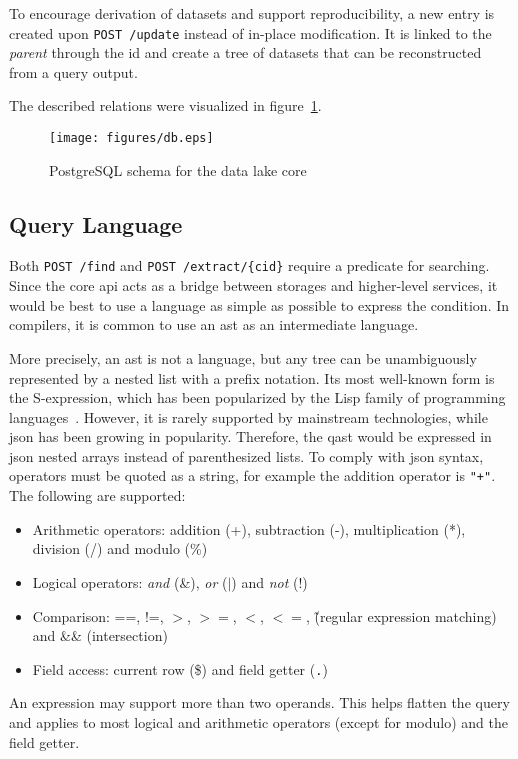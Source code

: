 To encourage derivation of datasets and support reproducibility, a new entry
is created upon \verb|POST /update| instead of in-place modification.  It is
linked to the \emph{parent} through the \gls{id} and create a \gls{tree}
of datasets that can be reconstructed from a query output.

The described relations were visualized in figure~\ref{db}.

\begin{figure}
  \texttt{[image: figures/db.eps]}
  \caption{PostgreSQL schema for the data lake core}
  \label{db}
\end{figure}

\subsection{Query Language}
Both \verb|POST /find| and \verb|POST /extract/{cid}| require a \gls{predicate}
for searching.  Since the core \gls{api} acts as a bridge between storages
and higher-level services, it would be best to use a language as simple
as possible to express the condition.  In compilers, it is common to use
an \gls{ast} as an intermediate language.

More precisely, an \gls{ast} is not a language, but any tree can
be unambiguously represented by a nested list with a prefix notation.
Its most well-known form is the S-expression, which has been popularized
by the Lisp family of programming languages~\cite{sexpr}.  However, it is
rarely supported by mainstream technologies, while \gls{json} has been
growing in popularity.  Therefore, the \gls{qast} would be expressed
in \gls{json} nested arrays instead of parenthesized lists.  To comply
with \gls{json} syntax, operators must be quoted as a string, for example
the addition operator is \verb|"+"|.  The following are supported:
\begin{itemize}
  \item Arithmetic operators: addition (+), subtraction (-), multiplication (*),
    division (/) and modulo (\%)
  \item Logical operators: \emph{and} (\&), \emph{or} ($\vert$)
    and \emph{not} (!)
  \item Comparison: ==, !=, $>$, $>=$, $<$, $<=$,
    \~ (regular expression matching) and \&\& (intersection)
  \item Field access: current row (\$) and field getter (\verb|.|)
\end{itemize}

An expression may support more than two operands.  This helps flatten the query
and applies to most logical and arithmetic operators (except for modulo)
and the field getter.


